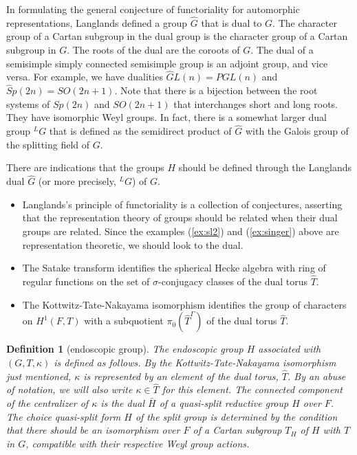 \documentclass[brochure,english,12pt]{bourbaki}
\newtheorem{definition}[equation]{Definition}
\begin{document}
In formulating the general conjecture of functoriality for automorphic
representations, Langlands defined a group $\hat G$ that is dual to
$G$.  The character group of a Cartan subgroup in the dual group is
the character group of a Cartan subgroup in $G$.  The roots of the
dual are the coroots of $G$.  The dual of a semisimple simply
connected semisimple group is an adjoint group, and vice versa.  For
example, we have dualities $\hat GL(n) = PGL(n)$ and
$\hat Sp(2n)=SO(2n+1)$.  Note that there is a bijection between the
root systems of $Sp(2n)$ and $SO(2n+1)$ that interchanges short and
long roots.  They have isomorphic Weyl groups.  In fact, there is a somewhat larger
dual group ${}^LG$ that is defined as the semidirect product of $\hat G$ with the Galois group of the splitting field of $G$.

There are indications that the groups $H$ should be defined through  
the Langlands dual $\hat G$ (or more precisely, ${}^LG$) of $G$.
\begin{itemize}
\item Langlands's principle of functoriality is a collection of conjectures, asserting that the
  representation theory of groups should be related when their dual
  groups are related.  Since the examples (\ref{ex:sl2}) and (\ref{ex:singer}) 
above are representation theoretic, we should look to the dual.
\item The Satake transform identifies the spherical Hecke algebra with
  ring of regular functions on the set of $\sigma$-conjugacy classes of the dual torus $\hat T$.
\item The Kottwitz-Tate-Nakayama isomorphism identifies the group of characters on $H^1(F,T)$
with a subquotient $\pi_0(\hat T^\Gamma)$ of the dual torus $\hat T$.
\end{itemize}

\begin{definition}[endoscopic group]
The endoscopic group $H$ associated with $(G,T,\kappa)$ is defined as follows.  By the Kottwitz-Tate-Nakayama isomorphism 
just mentioned, $\kappa$ is represented by an element of
the dual torus, $\hat T$.  By an abuse of notation, we will also write $\kappa\in \hat T$ for this element.
The connected component of the centralizer of $\kappa$ is the dual $\bar H$
of a quasi-split reductive group $H$ over $F$.  The choice quasi-split form $H$ of the split group is determined by the condition
that there should be an isomorphism over $F$ 
of a Cartan subgroup $T_H$ of $H$ with $T$ in $G$, compatible with their respective Weyl group actions.
\end{definition}
\end{document}

